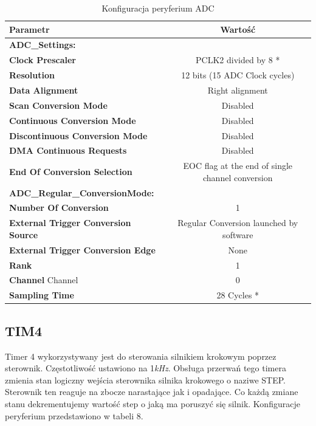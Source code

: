 \documentclass[10pt, a4paper]{article}
\begin{document}
\begin{table}[H]
	\centering
	\begin{tabular}{|l|c|} \hline
		\textbf{Parametr} & Wartość \\
 \hline 

\hline  \textbf{ADC{\_}Settings:}\\
\hline  \textbf{Clock Prescaler} &PCLK2 divided by 8 *\\
\hline  \textbf{Resolution }&12 bits (15 ADC Clock cycles)\\
\hline  \textbf{Data Alignment} &Right alignment\\
\hline  \textbf{Scan Conversion Mode}& Disabled\\
\hline  \textbf{Continuous Conversion Mode} &Disabled\\
\hline  \textbf{Discontinuous Conversion Mode}& Disabled\\
\hline  \textbf{DMA Continuous Requests}& Disabled\\
\hline  \textbf{End Of Conversion Selection}& EOC flag at the end of single channel conversion\\
\hline  \textbf{ADC{\_}Regular{\_}ConversionMode:}\\
\hline  \textbf{Number Of Conversion}& 1\\
\hline  \textbf{External Trigger Conversion Source }&Regular Conversion launched by software\\
\hline  \textbf{External Trigger Conversion Edge}& None\\
\hline  \textbf{Rank} &1\\
\hline  \textbf{Channel }Channel &0\\
\hline  \textbf{Sampling Time} &28 Cycles *\\
 \hline 
	\end{tabular}
	\caption{Konfiguracja peryferium ADC}
	\label{tab:USART}
\end{table}

\subsection{TIM4}
Timer 4 wykorzystywany jest do sterowania silnikiem krokowym poprzez sterownik. Częstotliwość ustawiono na 1\emph{kHz}. Obsługa przerwań tego timera zmienia stan logiczny wejścia sterownika silnika krokowego o naziwe STEP. Sterownik ten reaguje na zbocze narastające jak i opadające. Co każdą zmiane stanu dekrementujemy wartość step o jaką ma poruszyć się silnik. Konfiguracje peryferium przedstawiono w tabeli 8.
\end{document}
